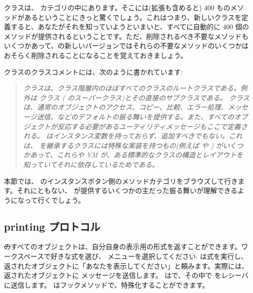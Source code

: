 \documentclass[a4paper,10pt,twoside]{book}
\begin{document}
 クラスは、 カテゴリの中にあります。そこには(拡張も含めると) 400 ものメソッドがあるということにきっと驚くでしょう。これはつまり、新しいクラスを定義すると、あなたがそれを知っていようといまいと、すべてに自動的に 400 個のメソッドが提供されるということです。ただ、削除されるべき不要なメソッドもいくつかあって、\pharo の新しいバージョンではそれらの不要なメソッドのいくつかはおそらく削除されることになることを覚えておきましょう。%

 クラスのクラスコメントには、次のように書かれています:

\begin{quote}
\textit{ クラスは、クラス階層内のほぼすべてのクラスのルートクラスである。例外は  クラス ( のスーパークラス)とその直接のサブクラスである。
 クラスは、通常のオブジェクトのアクセス、コピー、比較、エラー処理、メッセージ送信、などのデフォルトの振る舞いを提供する。また、すべてのオブジェクトが反応する必要があるユーティリティメッセージもここで定義される。
 はインスタンス変数を持っておらず、追加すべきでもない。これは、 を継承するクラスには特殊な実装を持つもの(例えば  や ) がいくつかあって、これらや VM が、ある標準的なクラスの構造とレイアウトを知っていてそれに依存しているためである。}
\end{quote}

本節では、 のインスタンスボタン側のメソッドカテゴリをブラウズして行きます。それにともない、 が提供するいくつかの主だった振る舞いが理解できるようになって行くでしょう。

\subsection{printing プロトコル}
\st のすべてのオブジェクトは、自分自身の表示用の形式を返すことができます。ワークスペースで好きな式を選び、 メニューを選択してください:  は式を実行し、返されたオブジェクトに「あなたを表示してください」と頼みます。実際には、返されたオブジェクトに  メッセージを送信します。 はで、その中で  をレシーバに送信します。 はフックメソッドで、特殊化することができます。%
\end{document}
